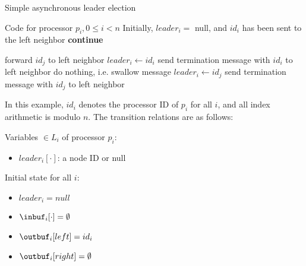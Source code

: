 \begin{algorithm}
\caption{Simple asynchronous leader election} \label{alg:ale}
\begin{algorithmic}[1]
\Statex Code for processor $p_i, 0 \leq i < n$
\Statex Initially, $leader_i = $ null, and $id_i$ has been sent to the left neighbor
        \State \textbf{continue}
    \EndIf

        \State forward $id_j$ to left neighbor
        \State $leader_i \gets id_i$
        \State send termination message with $id_i$ to left neighbor
        \State do nothing, i.e. swallow message
        \State $leader_i \gets id_j$
        \State send termination message with $id_j$ to left neighbor
    \EndIf
\EndFor
\end{algorithmic}
\end{algorithm}

In this example, $id_i$ denotes the processor ID of $p_i$ for all $i$, and all
index arithmetic is modulo $n$.
The transition relations are as follows:

Variables $\in L_i$ of processor $p_i$:
\begin{itemize}
\item $leader_i[\cdot]$: a node ID or null
\end{itemize}

Initial state for all $i$:
\begin{itemize}
\item $leader_i = null$
\item $\inbuf_i[\cdot] = \emptyset$
\item $\outbuf_i[left] = id_i$
\item $\outbuf_i[right] = \emptyset$
\end{itemize}

